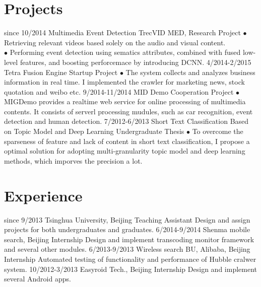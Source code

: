 \documentclass[]{friggeri-cv}
\begin{document}
\section{Projects}

\begin{entrylist}
  \entry
    {since 10/2014}
    {Multimedia Event Detection}
    {TrecVID MED, Research Project}
    {$\bullet$ Retrieving relevant videos based solely on the audio and visual content. \\
    $\bullet$ Performing event detection using sematics attributes, combined with fused low-level features, and boosting perforcemace by introducing DCNN.}
  \entry
    {4/2014-2/2015}
    {Tetra Fusion Engine}
    {Startup Project}
    {$\bullet$ The system collects and analyzes business information in real time. I implemented the crawler for marketing news, stock quotation and weibo etc.}
  \entry
    {9/2014-11/2014}
    {MID Demo}
    {Cooperation Project}
    {$\bullet$ MIGDemo provides a realtime web service for online processing of multimedia contents. It consists of serverl processing mudules, such as car recognition, event detection and human detection.}
  \entry
    {7/2012-6/2013}
    {Short Text Classification Based on Topic Model and Deep Learning}
    {Undergraduate Thesis}
    {$\bullet$ To overcome the sparseness of feature and lack of content in short text classification, I propose a optimal solution for adopting multi-granularity topic model and deep learning methods, which imporves the precision a lot.}
\end{entrylist}

\section{Experience}

\begin{entrylist}
  \entry
    {since 9/2013}
    {Tsinghua University, Beijing}
    {Teaching Assistant}
    {Design and assign projects for both undergraduates and graduates.}
  \entry
    {6/2014-9/2014}
    {Shenma mobile search, Beijing}
    {Internship}
    {Design and implement transcoding monitor framework and several other modules.}
  \entry
    {6/2013-9/2013}
    {Wireless search BU, Alibaba, Beijing}
    {Internship}
    {Automated testing of functionality and performance of Hubble cralwer system.}
  \entry
    {10/2012-3/2013}
    {Easyroid Tech., Beijing}
    {Internship}
    {Design and implement several Android apps.}
\end{entrylist}
\end{document}
